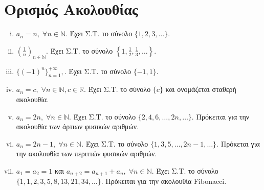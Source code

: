 \documentclass[main.tex]{subfiles}
\begin{document}
\section{Ορισμός Ακολουθίας}



\begin{examples}
\item {}
    \begin{enumerate}[i)]
        \item $ a_{n} = n, \; \forall n \in \mathbb{N} $. Έχει Σ.Τ. 
            το σύνολο $  \{ 1,2,3, \ldots \} $.
        \item $\left(\frac{1}{n}\right)_{n \in \mathbb{N}} $. Έχει Σ.Τ. το 
            σύνολο 
            $  \left\{ 1, \frac{1}{2}, \frac{1}{3}, \ldots \right\} $.
        \item $ \{(-1)^{n}\}_{n=1}^{+ \infty}, $. Έχει Σ.Τ. 
            το σύνολο $ \{ -1,1 \} $.
        \item $ a_{n} = c, \; \forall n \in \mathbb{N}, c \in \mathbb{R} $.
            Έχει Σ.Τ. το σύνολο $ \{ c \} $ και ονομάζεται
            \textcolor{Col\thechapter}{σταθερή ακολουθία}.
        \item $ a_{n}=2n, \; \forall n \in \mathbb{N} $. Έχει Σ.Τ. το 
            σύνολο $ \{ 2,4,6, \ldots, 2n, \ldots \} $. Πρόκειται για την 
            \textcolor{Col\thechapter}{ακολουθία των άρτιων} φυσικών 
            αριθμών.
        \item $ a_{n}= 2n-1, \; \forall n \in \mathbb{N} $. Έχει Σ.Τ. το 
            σύνολο $ \{ 1,3,5, \ldots, 2n-1, \ldots \} $. Πρόκεται για την 
            \textcolor{Col\thechapter}{ακολουθία των περιττών} φυσικών 
            αριθμών.
        \item \label{ex:anadr} $ a_{1}= a_{2} = 1 $ και $ a_{n+2}=a_{n+1}
            +a_{n}, \; \forall n \in \mathbb{N}$. Έχει Σ.Τ. το 
            σύνολο $ \{ 1,1,2,3,5,8, 13,21,34, \ldots\} $. 
            Πρόκειται για την \textcolor{Col\thechapter}{ακολουθία 
            Fibonacci}. 
    \end{enumerate}
\end{examples}
\end{document}
